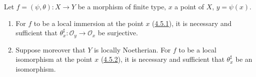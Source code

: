 \begin{proposition}[6.5.4]
\label{I.6.5.4}
Let $f=(\psi,\theta):X\to Y$ be a morphism of finite type, $x$ a point of
$X$, $y=\psi(x)$.
\begin{enumerate}
  \item[\textup{(i)}] For $f$ to be a local immersion at the point $x$
    \textup{(\hyperref[I.4.5.1]{4.5.1})}, it is necessary and sufficient that
    $\theta_x^\sharp:\mathscr{O}_y\to\mathscr{O}_x$ be surjective.
  \item[\textup{(ii)}] Suppose moreover that $Y$ is locally Noetherian. For $f$ to be
    a local isomorphism at the point $x$
    \textup{(\hyperref[I.4.5.2]{4.5.2})}, it is necessary and sufficient that
    $\theta_x^\sharp$ be an isomorphism.
\end{enumerate}
\end{proposition}

